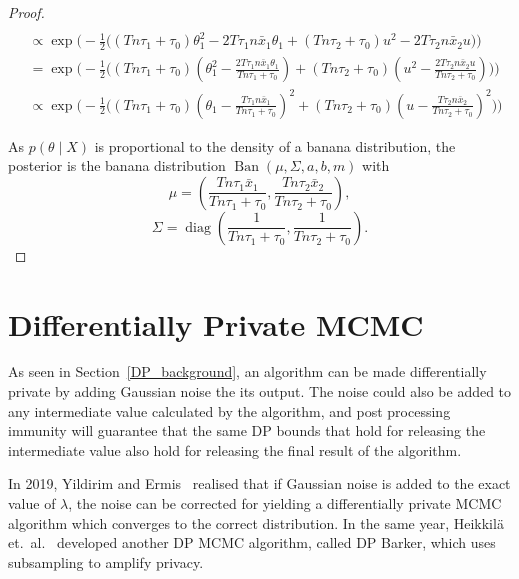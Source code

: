\documentclass[english,twoside,openright]{HYgraduMLDS}
\DeclareMathOperator{\ban}{Ban}
\DeclareMathOperator{\diag}{diag}
\begin{document}
\begin{proof}
\begin{align*}
        \\&\propto\exp\Bigg(-\frac{1}{2}\Big((Tn\tau_1 + \tau_0)\theta_1^2
        - 2T\tau_1n\bar{x}_1\theta_1
        + (Tn\tau_2 + \tau_0)u^2 - 2T\tau_2n\bar{x}_2u \Big)\Bigg)
        \\&=\exp\Bigg(-\frac{1}{2}\Big(
        (Tn\tau_1 + \tau_0)\left(\theta_1^2
        - \frac{2T\tau_1n\bar{x}_1\theta_1}{Tn\tau_1 + \tau_0} \right)
        + (Tn\tau_2 + \tau_0)\left(u^2 - \frac{2T\tau_2n\bar{x}_2u}
        {Tn\tau_2 + \tau_0}\right) \Big)\Bigg)
        \\&\propto\exp\Bigg(-\frac{1}{2}\Big(
        (Tn\tau_1 + \tau_0)\left(\theta_1
        - \frac{T\tau_1n\bar{x}_1}{Tn\tau_1 + \tau_0} \right)^2
        + (Tn\tau_2 + \tau_0)\left(u - \frac{T\tau_2n\bar{x}_2}
        {Tn\tau_2 + \tau_0}\right)^2 \Big)\Bigg)
    \end{align*}

    As \(p(\theta\mid X)\) is proportional to the density of a
    banana distribution, the posterior is the banana distribution
    \(\ban(\mu, \Sigma, a, b, m)\)
    with
    \[
        \mu = \left(\frac{Tn\tau_1\bar{x}_1}{Tn\tau_1 + \tau_0},
        \frac{Tn\tau_2\bar{x}_2}{Tn\tau_2 + \tau_0}\right),
    \]
    \[
        \Sigma = \diag\left(
            \frac{1}{Tn\tau_1 + \tau_0},
            \frac{1}{Tn\tau_2 + \tau_0}
        \right).
    \]
\end{proof}

\chapter{Differentially Private MCMC}

As seen in Section~\ref{DP_background}, an algorithm can be made differentially 
private by adding Gaussian noise the its output. The noise could also be added 
to any intermediate value calculated by the algorithm, and post processing immunity 
will guarantee that the same DP bounds that hold for releasing the intermediate 
value also hold for releasing the final result of the algorithm.

In 2019, Yildirim and Ermis~\cite{YildirimE19} realised that if Gaussian noise is added to 
the exact value of \(\lambda\), the noise can be corrected for 
yielding a differentially private MCMC algorithm which converges to 
the correct distribution. In the same year, Heikkilä et.\ al.~\cite{HeikkilaJDH19}
developed another DP MCMC algorithm, called DP Barker, which uses subsampling 
to amplify privacy.
\end{document}
